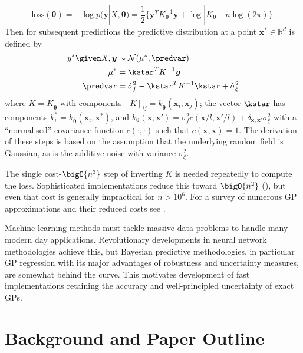 \begin{equation}
  \mbox{loss}(\bm{\theta}) = -\log p(\bm{y}|X,\bm{\theta}) = \frac{1}{2}\{ \bm{y}^T K_{\bm{\theta}}^{-1} \bm{y} + \log|K_{\bm{\theta}}| + n \log(2 \pi) \}.\label{eq:gp_los_func}
\end{equation}
Then for subsequent predictions the predictive distribution at a point $\bm{x}^* \in \mathbb{R}^d$ is defined by 
\begin{align}
  y^*\given X,\bm{y} &\sim \mathcal{N}(\mu^*,\predvar) \label{eq:gp_pred}\\
  \mu^* &= {\kstar}^T K ^{-1}\bm{y} \label{eq:gp_mean_pred}\\
  \predvar &= \hat{\sigma}_f^2 - {\kstar}^T K^{-1}\kstar + \hat{\sigma}_\xi^2 \label{eq:gp_var_pred}
\end{align}
where $K = K_{\hat{\bm{\theta}}}$ with components \([K]_{ij}=k_{\hat{\bm{\theta}}}(\bm{x}_i,\bm{x}_j)\); the vector $\kstar$ has components $k^*_i= k_{\hat{\bm{\theta}}}(\bm{x}_i,\bm{x}^*)$, and \(k_{\bm{\theta}}(\bm{x},\bm{x}') = \sigma_f^2c(\bm{x}/l,\bm{x}'/l) + \delta_{\bm{x},\bm{x}'}\sigma_\xi^2\) with a ``normalised'' covariance function \(c(\cdot,\cdot)\) such that \(c(\bm{x},\bm{x})=1\). The derivation of these steps is based on the assumption that the underlying random field is Gaussian, as is the additive noise with variance $\sigma_\xi^2$.

The single cost-$\bigO{n^3}$ step of inverting $K$ is needed repeatedly to compute the loss. Sophisticated implementations reduce this toward $\bigO{n^2}$ (\cite{exact_big_GP}), but even that cost is generally impractical for $n > 10^6$. For a survey of numerous GP approximations and their reduced costs see \cite{GP_approx_review}. 

Machine learning methods must tackle massive data problems to handle many modern day applications. Revolutionary developments in neural network methodologies achieve this, but Bayesian predictive methodologies, in particular GP regression with its major advantages of robustness and uncertainty measures, are somewhat behind the curve. This motivates development of fast implementations retaining the accuracy and well-principled uncertainty of exact GPs.


\section{Background and Paper Outline}

